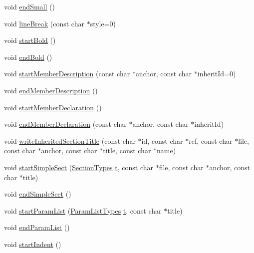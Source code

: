 \begin{DoxyCompactItemize}
void \hyperlink{class_output_list_a8142de5d17dd16fce39b80c0dfc3dfe2}{end\+Small} ()
\item 
void \hyperlink{class_output_list_a492a56a47cd88f46dfc05279a692159e}{line\+Break} (const char $\ast$style=0)
\item 
void \hyperlink{class_output_list_a796018ee85949771252f36fea9a288d0}{start\+Bold} ()
\item 
void \hyperlink{class_output_list_aa3f855a4e60d2a7c6769b66d43c69b23}{end\+Bold} ()
\item 
void \hyperlink{class_output_list_a4f5875478094ba5b26bca0d8969fe2f1}{start\+Member\+Description} (const char $\ast$anchor, const char $\ast$inherit\+Id=0)
\item 
void \hyperlink{class_output_list_a3824b9043050bea2202a29c15b4c5344}{end\+Member\+Description} ()
\item 
void \hyperlink{class_output_list_a09a4062cfac0ed8f9d3dec4cd42f1aa7}{start\+Member\+Declaration} ()
\item 
void \hyperlink{class_output_list_a735dc59d01be196a7f31b2396ff98c76}{end\+Member\+Declaration} (const char $\ast$anchor, const char $\ast$inherit\+Id)
\item 
void \hyperlink{class_output_list_a9fe7e6e7aa48eee2ccdca4e704cff96a}{write\+Inherited\+Section\+Title} (const char $\ast$id, const char $\ast$ref, const char $\ast$file, const char $\ast$anchor, const char $\ast$title, const char $\ast$name)
\item 
void \hyperlink{class_output_list_a2bf0b9cae987f44d8eb7fe798b219512}{start\+Simple\+Sect} (\hyperlink{class_base_output_doc_interface_a07a3d5df76a714674e070e5e236fe886}{Section\+Types} \hyperlink{058__bracket__recursion_8tcl_a69e959f6901827e4d8271aeaa5fba0fc}{t}, const char $\ast$file, const char $\ast$anchor, const char $\ast$title)
\item 
void \hyperlink{class_output_list_ad6ec67690fed6ec9b09df3d7c98f673f}{end\+Simple\+Sect} ()
\item 
void \hyperlink{class_output_list_ab981978bf338f7ebf63200533a99d305}{start\+Param\+List} (\hyperlink{class_base_output_doc_interface_a944ed4d9fb389999c2724eeb321b8c8c}{Param\+List\+Types} \hyperlink{058__bracket__recursion_8tcl_a69e959f6901827e4d8271aeaa5fba0fc}{t}, const char $\ast$title)
\item 
void \hyperlink{class_output_list_a9f7355d80e1d26ae3c1daec5c156bbfb}{end\+Param\+List} ()
\item 
void \hyperlink{class_output_list_a5805e09c663ccde368463f3c6a767a59}{start\+Indent} ()

\end{DoxyCompactItemize}
